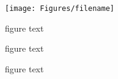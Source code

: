 \begin{figure}[!htb]
\begin{center}\texttt{[image: Figures/filename]}
\end{center}
\caption{figure text}
\label{fig:fig1}
\end{figure}

\begin{figure}[!htb]
\centering
{}
\qquad
{}
\caption{figure text}
\label{fig:fig1}
\end{figure}


\begin{figure}[!htb]
\centering
{}
\qquad
{}
\qquad
{}
\qquad
{}
\caption{figure text}
\label{fig:fig1}
\end{figure}